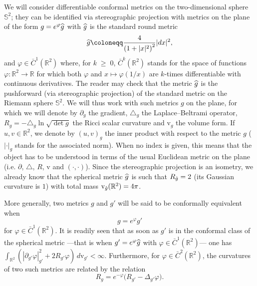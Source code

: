 \documentclass[10pt]{amsart}
\theoremstyle{definition}\newtheorem{defi}[theo]{Definition}\newtheorem{rema}[theo]{Remark}\newtheorem{exam}[theo]{Example}\newtheorem{exem}[theo]{Example}\newtheorem{nota}[theo]{Notation}
\renewcommand{\geq}{\;\geqslant\;}
\newcommand{\rmv}{\mathrm{v}}
\newcommand{\R}{\mathbb{R}}
\renewcommand*\S{\mathbb{S}}
\let\oldhat\hat
\renewcommand*{\hat}[1]{\mathchoice{\widehat{#1}}{\widehat{#1}}{\oldhat{#1}}{\oldhat{#1}}}
\begin{document}
We will consider differentiable conformal metrics on the two-dimensional sphere $\S^2$; they can be identified via stereographic projection with metrics on the plane of the form $g=e^{\varphi}\hat{g}$ with $\hat{g}$ is the standard round metric
\begin{equation}
\hat{g}\coloneqq \frac{4}{\left(1+|x|^2\right)^2}|dx|^2,
\end{equation}
and $\varphi\in\bar{C}^1(\R^2)$ where, for $k\geq 0$, $ \bar{C}^k(\R^2)$ stands for the space of functions $\varphi:\R^2\to\R$ for which both $\varphi$ and $x\mapsto\varphi (1/x)$ are $k$-times differentiable with continuous derivatives. The reader may check that the metric $ \hat{g}$ is the pushforward (via stereographic projection) of the standard metric on the Riemann sphere $\S^2$. We will thus work with such metrics $g$ on the plane, for which we will denote by $\partial_g$ the gradient, $\triangle_g$ the Laplace--Beltrami operator, $R_g=-\triangle_g\ln \sqrt{\det g}$ the Ricci scalar curvature and $\rmv_g$ the volume form. If $u,v\in\R^2$, we denote by $(u,v)_{g}$ the inner product with respect to the metric $g$ ($|\cdot |_{g}$ stands for the associated norm). When no index is given, this means that the object has to be understood in terms of the usual Euclidean metric on the plane (i.e. $\partial$, $\triangle$, $R$, $\rmv$ and $(\cdot,\cdot)$). Since the stereographic projection is an isometry, we already know that the spherical metric $\hat g$ is such that $R_{\hat g}=2$ (its Gaussian curvature is $1$) with total mass $\rmv_{\hat g}(\R^2)=4\pi$.

More generally, two metrics $g$ and $g'$ will be said to be conformally equivalent when
\[
g =e^{\varphi}g'
\]
for $\varphi \in \bar{C}^1(\R^2) $. It is readily seen that as soon as $g'$ is in the conformal class of the spherical metric ---that is when $g'=e^{\varphi}\hat g$ with $\varphi \in \bar{C}^1(\R^2) $--- one has ${\int_{\R^2}
(|\partial_{g'} \varphi|^2_{g'} + 2 R_{g'} \varphi) \,d\rmv_{g'} <\infty}$. Furthermore, for $\varphi \in \bar{C}^2(\R^2) $, the curvatures of two such metrics are related by the relation
\begin{equation}\label{curvature}
R_g=e^{-\varphi}\big(R_{g'}-\Delta_{g'}\varphi\big).
\end{equation}
\end{document}
